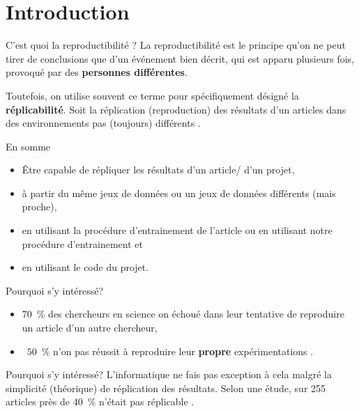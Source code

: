 \documentclass{beamer}
\begin{document}
	\section{Introduction}
	\begin{frame}{C'est quoi la reproductibilité ?}
		La reproductibilité est le principe qu'on ne peut tirer de conclusions que d'un événement bien décrit, qui est apparu plusieurs fois, provoqué par des \textbf{personnes différentes}.
		
		Toutefois, on utilise souvent ce terme pour spécifiquement désigné la \textbf{réplicabilité}. Soit la réplication (reproduction) des résultats d'un articles dans des environnements pas (toujours) différents \cite{replicationvsreproductiblity, pineau2020improving}.
	\end{frame}

	\begin{frame}{En somme}
		\begin{itemize}
			\item Être capable de répliquer les résultats d'un article/ d'un projet,
			\item à partir du même jeux de données ou un jeux de données différents (mais proche),
			\item en utilisant la procédure d'entrainement de l'article ou en utilisant notre procédure d'entrainement et
			\item en utilisant le code du projet.
		\end{itemize}
	\end{frame}

	\begin{frame}{Pourquoi s'y intéressé?}
		\begin{itemize}
			\item $70$~\% des chercheurs en science on échoué dans leur tentative de reproduire un article d'un autre chercheur,
			\item ~$50$~\% n'on pas réussit à reproduire leur \textbf{propre} expérimentations \cite{baker500ScientistsLift2016}.
		\end{itemize}
	\end{frame}

	\begin{frame}{Pourquoi s'y intéressé?}
		L'informatique ne fais pas exception à cela malgré la simplicité (théorique) de réplication des résultats. Selon une étude, sur 255 articles près de $40$~\% n'était pas réplicable \cite{raff2019step}.
	\end{frame}
\end{document}
